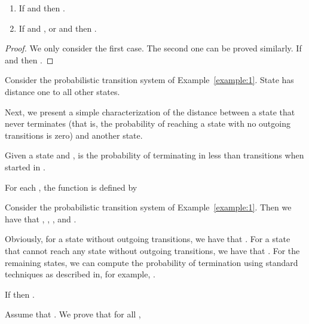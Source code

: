 \documentclass{LMCS}
\begin{document}
\begin{prop}
\label{proposition:A}
\mbox{}
\begin{enumerate}[]
\item
If  and  then .
\item
If  and , or  and 
 then .
\end{enumerate}
\end{prop}
\begin{proof}
We only consider the first case.  The second one can be proved similarly.
If  and  then
.
\end{proof}

\begin{exa}
Consider the probabilistic transition system of Example~\ref{example:1}.
State  has distance one to all other states.
\end{exa}

Next, we present a simple characterization of the distance between a state 
that never terminates (that is, the probability of reaching a state with no 
outgoing transitions is zero) and another state.

Given a state  and ,  is the probability
of terminating in less than  transitions when started in .

\begin{defi}
\label{definition:termination}
For each , the function 
is defined by

\end{defi}

\begin{exa}
Consider the probabilistic transition system of Example~\ref{example:1}.
Then we have that , 
, ,
 and .
\end{exa}

Obviously, for a state  without outgoing transitions, we have
that .  For a state  that cannot reach
any state without outgoing transitions, we have that .
For the remaining states, we can compute the probability of termination
using standard techniques as described in, for example, 
\cite[Section~11.2]{GS97}.

\begin{prop}
\label{proposition:7a}
If  then .
\end{prop}
\proof Assume that .  We prove that for all ,
\end{document}
